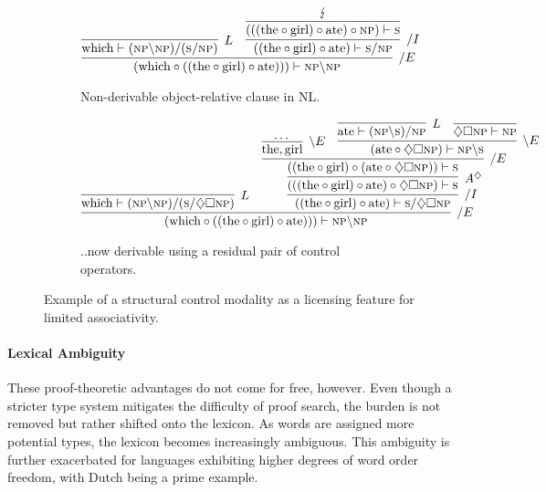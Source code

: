 \begin{figure}[t]
	\begin{subfigure}[b]{1\textwidth}
	\centering
	\[
	\infer[/E]{(\text{which} \circ ((\text{the} \circ \text{girl}) \circ \text{ate}))) \vdash \textsc{np}\backslash \textsc{np}}{
		\infer[L]{\text{which} \vdash (\textsc{np} \backslash \textsc{np}) / (\textsc{s} / \textsc{np})}{}
		&
		\infer[/I]{((\text{the} \circ \text{girl}) \circ \text{ate}) \vdash \textsc{s}/ \textsc{np}}{
			\infer[]{(((\text{the} \circ \text{girl}) \circ \text{ate}) \circ \textsc{np}) \vdash \textsc{s}}{
			\lightning
			}
		}
	}
	\]
	\caption[Non-derivable object-relative clause]{Non-derivable object-relative clause in NL.}		
	\label{fig:nl_en:nd}
	\end{subfigure}
	\begin{subfigure}[b]{1\textwidth}
		\centering
	\[
	\infer[/E]{(\text{which} \circ ((\text{the} \circ \text{girl}) \circ \text{ate}))) \vdash \textsc{np}\backslash \textsc{np}}{
		\infer[L]{\text{which} \vdash (\textsc{np} \backslash \textsc{np}) / (\textsc{s} / \diamondsuit \Box \textsc{np})}{}
		&
		\infer[/I]{((\text{the} \circ \text{girl}) \circ \text{ate}) \vdash \textsc{s}/ \diamondsuit \Box \textsc{np}}{
			\infer[A^{\diamondsuit}]{(((\text{the} \circ \text{girl}) \circ \text{ate}) \circ \diamondsuit \Box \textsc{np}) \vdash \textsc{s}}{
			\infer[/E]{((\text{the} \circ \text{girl}) \circ (\text{ate} \circ \diamondsuit \Box \textsc{np}))\vdash \textsc{s}}{
				\infer[\backslash E]{\text{the}, \text{girl}}{\dots}
				&
				\infer[\backslash E]{(\text{ate} \circ \diamondsuit \Box \textsc{np}) \vdash \textsc{np} \backslash \textsc{s}}{
					\infer[L]{\text{ate} \vdash (\textsc{np}\backslash \textsc{s})/\textsc{np}}{}
					&
					\infer[]{\diamondsuit \Box \textsc{np} \vdash \textsc{np}}{}
				}
			}
			}
		}
	}
	\]
	\caption{..now derivable using a residual pair of control operators.}
	\label{fig:nl_en:d}
	\end{subfigure}
	\caption[Structural Control Example]{Example of a structural control modality as a licensing feature for limited associativity.}
\end{figure}


\paragraph{Lexical Ambiguity}
These proof-theoretic advantages do not come for free, however.
Even though a stricter type system mitigates the difficulty of proof search, the burden is not removed but rather shifted onto the lexicon.
As words are assigned more potential types, the lexicon becomes increasingly ambiguous.
This ambiguity is further exacerbated for languages exhibiting higher degrees of word order freedom, with Dutch being a prime example.

